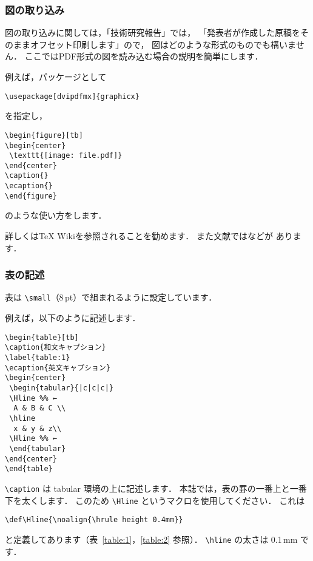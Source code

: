 \documentclass[technicalreport]{ieicej}
\begin{document}
\subsubsection{図の取り込み}

図の取り込みに関しては，「技術研究報告」では，
「発表者が作成した原稿をそのままオフセット印刷します」ので，
図はどのような形式のものでも構いません．
ここではPDF形式の図を読み込む場合の説明を簡単にします．

例えば，パッケージとして
\begin{verbatim}
\usepackage[dvipdfmx]{graphicx}
\end{verbatim}
を指定し，
\begin{verbatim}
\begin{figure}[tb]
\begin{center}
 \texttt{[image: file.pdf]}
\end{center}
\caption{}
\ecaption{}
\end{figure}
\end{verbatim}
のような使い方をします．

詳しくはTeX Wiki\cite{texwiki}を参照されることを勧めます．
また文献では\cite{FMi1,latex,FMi2,Nakano,otobe,Okumura3,Eguchi}などが
あります．

\subsubsection{表の記述}

表は \verb/\small/（8\,pt）で組まれるように設定しています．

例えば，以下のように記述します．
\begin{verbatim}
\begin{table}[tb]
\caption{和文キャプション}
\label{table:1}
\ecaption{英文キャプション}
\begin{center}
 \begin{tabular}{|c|c|c|}
 \Hline %% ←
  A & B & C \\
 \hline
  x & y & z\\
 \Hline %% ←
 \end{tabular}
\end{center}
\end{table}
\end{verbatim}

\verb/\caption/ は tabular 環境の上に記述します．
本誌では，表の罫の一番上と一番下を太くします．
このため \verb/\Hline/ というマクロを使用してください．
これは
\begin{verbatim}
\def\Hline{\noalign{\hrule height 0.4mm}}
\end{verbatim}
と定義してあります（表~\ref{table:1}，\ref{table:2} 参照）．
\verb/\hline/ の太さは 0.1\,mm です．
\end{document}
